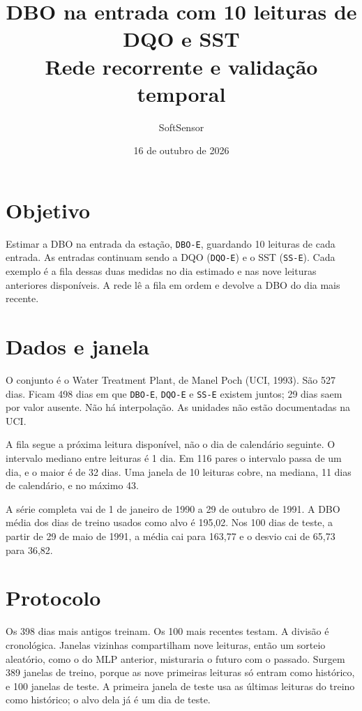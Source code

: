 \documentclass[11pt,a4paper]{article}
\title{DBO na entrada com 10 leituras de DQO e SST\\[0.3em]
\large Rede recorrente e validação temporal}
\author{SoftSensor}
\date{16 de outubro de 2026}
\begin{document}
\maketitle

\section{Objetivo}

Estimar a DBO na entrada da estação, \texttt{DBO-E}, guardando 10 leituras de cada entrada. As entradas continuam sendo a DQO (\texttt{DQO-E}) e o SST (\texttt{SS-E}). Cada exemplo é a fila dessas duas medidas no dia estimado e nas nove leituras anteriores disponíveis. A rede lê a fila em ordem e devolve a DBO do dia mais recente.

\section{Dados e janela}

O conjunto é o Water Treatment Plant, de Manel Poch (UCI, 1993). São 527 dias. Ficam 498 dias em que \texttt{DBO-E}, \texttt{DQO-E} e \texttt{SS-E} existem juntos; 29 dias saem por valor ausente. Não há interpolação. As unidades não estão documentadas na UCI.

A fila segue a próxima leitura disponível, não o dia de calendário seguinte. O intervalo mediano entre leituras é 1 dia. Em 116 pares o intervalo passa de um dia, e o maior é de 32 dias. Uma janela de 10 leituras cobre, na mediana, 11 dias de calendário, e no máximo 43.

A série completa vai de 1 de janeiro de 1990 a 29 de outubro de 1991. A DBO média dos dias de treino usados como alvo é 195,02. Nos 100 dias de teste, a partir de 29 de maio de 1991, a média cai para 163,77 e o desvio cai de 65,73 para 36,82.

\section{Protocolo}

Os 398 dias mais antigos treinam. Os 100 mais recentes testam. A divisão é cronológica. Janelas vizinhas compartilham nove leituras, então um sorteio aleatório, como o do MLP anterior, misturaria o futuro com o passado. Surgem 389 janelas de treino, porque as nove primeiras leituras só entram como histórico, e 100 janelas de teste. A primeira janela de teste usa as últimas leituras do treino como histórico; o alvo dela já é um dia de teste.
\end{document}
